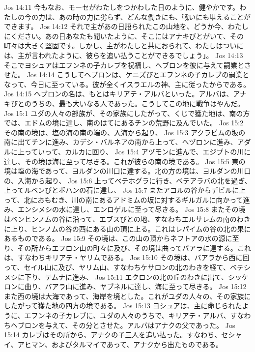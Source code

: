 Jos 14:11  今もなお、モーセがわたしをつかわした日のように、健やかです。わたしの今の力は、あの時の力に劣らず、どんな働きにも、戦いにも堪えることができます。
Jos 14:12  それで主があの日語られたこの山地を、どうか今、わたしにください。あの日あなたも聞いたように、そこにはアナキびとがいて、その町々は大きく堅固です。しかし、主がわたしと共におられて、わたしはついには、主が言われたように、彼らを追い払うことができるでしょう」。
Jos 14:13  そこでヨシュアはエフンネの子カレブを祝福し、ヘブロンを彼に与えて嗣業とさせた。
Jos 14:14  こうしてヘブロンは、ケニズびとエフンネの子カレブの嗣業となって、今日に至っている。彼が全くイスラエルの神、主に従ったからである。
Jos 14:15  ヘブロンの名は、もとはキリアテ・アルバといった。アルバは、アナキびとのうちの、最も大いなる人であった。こうしてこの地に戦争はやんだ。
Jos 15:1  ユダの人々の部族が、その家族にしたがって、くじで獲た地は、南の方では、エドムの境に達し、南のはてにあるチンの荒野に及んでいた。
Jos 15:2  その南の境は、塩の海の南の端の、入海から起り、
Jos 15:3  アクラビムの坂の南に出てチンに進み、カデシ・バルネアの南から上って、ヘヅロンに進み、アダルに上っていって、カルカに回り、
Jos 15:4  アヅモンに進んで、エジプトの川に達し、その境は海に至って尽きる。これが彼らの南の境である。
Jos 15:5  東の境は塩の海であって、ヨルダンの川口に達する。北の方の境は、ヨルダンの川口の、入海から起り、
Jos 15:6  上ってベテホグラに行き、ベテアラバの北を過ぎ、上ってルベンびとボハンの石に達し、
Jos 15:7  またアコルの谷からデビルに上って、北におもむき、川の南にあるアドミムの坂に対するギルガルに向かって進み、エンシメシの水に達し、エンロゲルに至って尽きる。
Jos 15:8  またその境はベンヒンノムの谷に沿って、エブスびとの地、すなわちエルサレムの南のわきに上り、ヒンノムの谷の西にある山の頂に上る。これはレパイムの谷の北の果にあるものである。
Jos 15:9  その境は、この山の頂からネフトアの水の源に至り、その所からエフロン山の町々に及び、その境は曲ってバアラに達する。これは、すなわちキリアテ・ヤリムである。
Jos 15:10  その境は、バアラから西に回って、セイル山に及び、ヤリム山、すなわちケサロンの北のわきを経て、ベテシメシに下り、テムナに進み、
Jos 15:11  エクロンの北の丘のわきに出て、シッケロンに曲り、バアラ山に進み、ヤブネルに達し、海に至って尽きる。
Jos 15:12  また西の境は大海であって、海岸を境とした。これがユダの人々の、その家族にしたがって獲た地の四方の境である。
Jos 15:13  ヨシュアは、主に命じられたように、エフンネの子カレブに、ユダの人々のうちで、キリアテ・アルバ、すなわちヘブロンを与えて、その分とさせた。アルバはアナクの父であった。
Jos 15:14  カレブはその所から、アナクの子三人を追い払った。すなわち、セシャイ、アヒマン、およびタルマイであって、アナクから出たものである。
